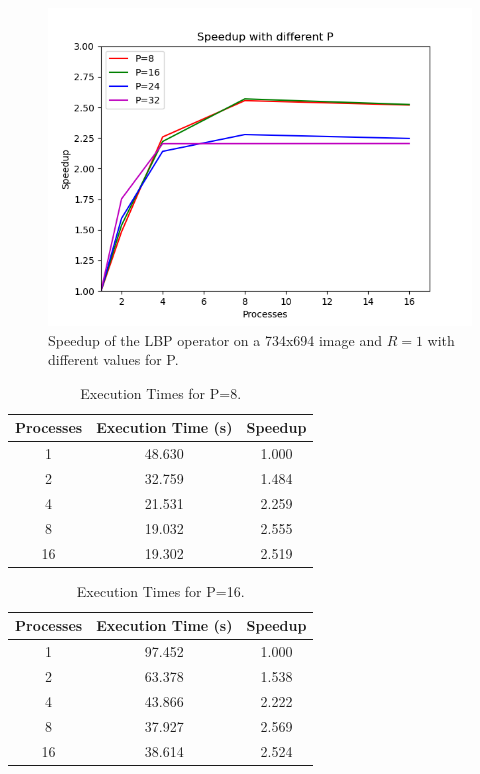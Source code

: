 \documentclass[10pt,twocolumn,letterpaper]{article}
\begin{document}
\begin{figure}[H]
	\includegraphics[width=\linewidth]{images/speedup_by_p.png}
	\caption{Speedup of the LBP operator on a 734x694 image and $R = 1$ with different values for P.}
	\label{fig:speedup_kernel}
\end{figure}

\begin{table}[H]
	\begin{center}
		\begin{tabular}{|c|c|c|}
			\hline
			Processes & Execution Time (s) & Speedup \\
			\hline
			1 & 48.630 & 1.000 \\
			2 & 32.759 & 1.484 \\
			4 & 21.531 & 2.259 \\
			8 & 19.032 & 2.555 \\
			16 & 19.302 & 2.519 \\
			\hline
		\end{tabular}
	\end{center}
	\caption{Execution Times for P=8.}
	\label{tab:speedup_p_1}
\end{table}

\begin{table}[H]
	\begin{center}
		\begin{tabular}{|c|c|c|}
			\hline
			Processes & Execution Time (s) & Speedup \\
			\hline
			1 & 97.452 & 1.000 \\
			2 & 63.378 & 1.538 \\
			4 & 43.866 & 2.222 \\
			8 & 37.927 & 2.569 \\
			16 & 38.614 & 2.524 \\
			\hline
		\end{tabular}
	\end{center}
	\caption{Execution Times for P=16.}
	\label{tab:speedup_p_2}
\end{table}
\end{document}
